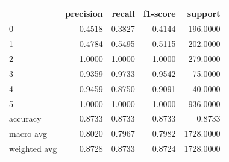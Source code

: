 \begin{tabular}{lrrrr}
\toprule
 & precision & recall & f1-score & support \\
\midrule
0 & 0.4518 & 0.3827 & 0.4144 & 196.0000 \\
1 & 0.4784 & 0.5495 & 0.5115 & 202.0000 \\
2 & 1.0000 & 1.0000 & 1.0000 & 279.0000 \\
3 & 0.9359 & 0.9733 & 0.9542 & 75.0000 \\
4 & 0.9459 & 0.8750 & 0.9091 & 40.0000 \\
5 & 1.0000 & 1.0000 & 1.0000 & 936.0000 \\
accuracy & 0.8733 & 0.8733 & 0.8733 & 0.8733 \\
macro avg & 0.8020 & 0.7967 & 0.7982 & 1728.0000 \\
weighted avg & 0.8728 & 0.8733 & 0.8724 & 1728.0000 \\
\bottomrule
\end{tabular}
